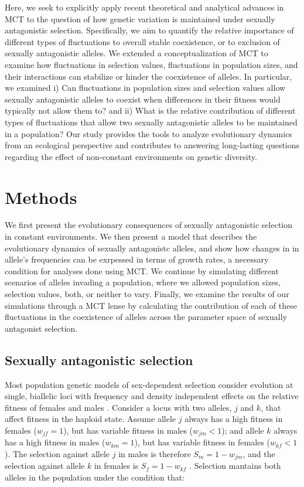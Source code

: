 \documentclass[12pt]{article}
\begin{document}
Here, we seek to explicitly apply recent theoretical and analytical advances in MCT to the question of how
genetic variation is maintained under sexually antagonistic selection. Specifically, we aim to quantify the relative importance of different types of fluctuations to overall stable coexistence, or to exclusion of sexually antagonistic alleles. We extended a conceptualization of MCT \citep{ellner2016quantify,ellner_expanded_2019} to examine how fluctuations in selection values, fluctuations in population sizes, and their interactions can stabilize or hinder the coexistence of alleles. In particular, we examined i) Can fluctuations in population sizes and selection values allow sexually antagonistic alleles to coexist when differences in their fitness would typically not allow them to? and ii) What is the relative contribution of different types of fluctuations that allow two sexually antagonistic alleles to be maintained in a population? Our study provides the tools to analyze evolutionary dynamics from an ecological perspective and contributes to answering long-lasting questions regarding the effect of non-constant environments on genetic diversity.



\section{Methods}
We first present the evolutionary consequences of sexually antagonistic selection in constant environments. We then present a model that describes the evolutionary dynamics of sexually antagonistc alleles, and show how changes in  in allele's frequencies can be exrpessed in terms of growth rates, a necessary condition for analyses done using MCT. We continue by  simulating different scenarios of alleles invading a population, where we allowed population sizes, selection values, both, or neither to vary. Finally, we examine the results of our simulations through a MCT lense by  calculating the contribution of each of these fluctuations in the coexistence of alleles across the parameter space of sexually antagonist selection.


\subsection*{Sexually antagonistic selection}

 Most population genetic models of sex-dependent selection consider evolution at single, biallelic  loci with frequency and density independent effects on the relative fitness of females and males \citep{wright1942statistical,kidwell1977regions, immler2012ploidally}. Consider a locus with two alleles, $j$ and $k$, that affect fitness in the haploid state.  Assume allele $j$ always has a high fitness in females ($w_{jf} = 1$), but has variable fitness in males ($w_{jm} < 1$); and allele $k$ always has a high fitness in males ($w_{km} = 1$), but has variable fitness in females ($w_{kf} < 1 $). The selection against allele $j$ in males is therefore $S_{m}= 1 - w_{jm}$, and the selection against allele $k$ in females is $S_{f}= 1 - w_{kf}$ . Selection mantains both alleles in the population under the condition that:
\end{document}
